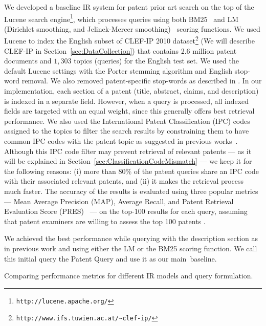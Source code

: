 We developed a baseline IR system for patent prior art search on the top of
the Lucene search engine\footnote{\texttt{http://lucene.apache.org/}}, which processes queries using both BM25~\citep{Robertson1993} and LM (Dirichlet
smoothing, and Jelinek-Mercer smoothing)~\citep{zhai2004study} scoring functions. %
We used Lucene to index the English subset of CLEF-IP 2010 dataset\footnote{\texttt{http://www.ifs.tuwien.ac.at/\textasciitilde{}clef-ip/}} 
(We will describe CLEF-IP in Section~\ref{sec:DataCollection}) that contains 2.6 million patent documents and $1,303$ topics (queries) for the English test set.
We used the default Lucene settings with the Porter stemming algorithm \cite{Porter1980} and English stop-word removal. 
We also removed patent-specific stop-words as described in \cite{magdy2012toward}.
In
our implementation, each section of a patent (title, abstract, claims,
and description) is indexed in a separate field. However, when a query 
is processed, all indexed fields are targeted with an equal weight, since this generally
offers best retrieval performance. We also used the International
Patent Classification (IPC) codes assigned to the topics to filter
the search results by constraining them to have common IPC codes with
the patent topic as suggested in previous works~\citep{lopez2010patatras}.
Although this IPC code filter may prevent retrieval of relevant patents 
--- as it will be explained in Section~\ref{sec:ClassificationCodeMismatch} --- we
keep it for the following reasons: (i) more than 80\%
of the patent queries share an IPC code with their associated relevant
patents, and (ii) it makes the retrieval process much faster. The accuracy of the results is evaluated 
using three popular metrics --- Mean Average Precision (MAP), Average Recall, and Patent Retrieval Evaluation 
Score (PRES)~\citep{magdy2012toward} --- on the top-100 results for each query, assuming that patent examiners 
are willing to assess the top 100 patents \citep{joho2010survey}. 

We achieved the best performance while querying with the description
section as in previous work \citep{xue2009transforming} and using
either the LM or the BM25 scoring function. 
We call this initial 
query the Patent Query and use it as our main~baseline.
\begin{savenotes}
\begin{table*}[t!]
  \begin{center}
  \caption{Comparing performance metrics for different IR models and query formulation.}
   
  \label{tab:IRmodels_Sections}
  \end{center}  
\end{table*}
\end{savenotes}

